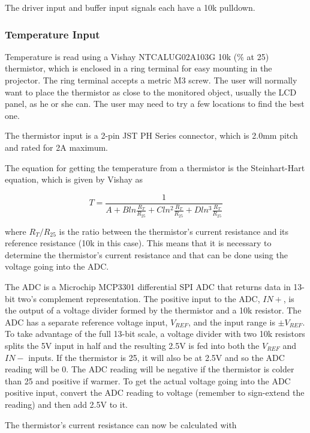 \documentclass{article}
\begin{document}
The driver input and buffer input signals each have a 10k\textOmega{} pulldown.

\subsubsection{Temperature Input} \label{sssec:TempInput}
Temperature is read using a Vishay NTCALUG02A103G 10k (\% at 25\textcelsius) thermistor,
which is enclosed in a ring terminal for easy mounting in the projector.  The ring terminal accepts
a metric M3 screw.  The user will normally want to place the thermistor as close to the monitored
object, usually the LCD panel, as he or she can.  The user may need to try a few locations to find
the best one.

The thermistor input is a 2-pin JST PH Series connector, which is 2.0mm pitch and rated for 2A maximum.

The equation for getting the temperature from a thermistor is the Steinhart-Hart equation, which is
given by Vishay as

\[
T = \frac{1}{A + Bln\frac{R_T}{R_{25}} + Cln^2\frac{R_T}{R_{25}} + Dln^3\frac{R_T}{R_{25}}}
\]

where $R_T/R_{25}$ is the ratio between the thermistor's current resistance and its reference
resistance (10k\textOmega{} in this case).  This means that it is necessary to determine the
thermistor's current resistance and that can be done using the voltage going into the ADC.

The ADC is a Microchip MCP3301 differential SPI ADC that returns data in 13-bit two's complement
representation.  The positive input to the ADC, $IN+$, is the output of a voltage divider formed by
the thermistor and a 10k\textOmega{} resistor.  The ADC has a separate reference voltage input,
$V_{REF}$, and the input range is $\pm V_{REF}$.  To take advantage of the full 13-bit scale, a
voltage divider with two 10k\textOmega{} resistors splits the 5V input in half and the resulting
2.5V is fed into both the $V_{REF}$ and $IN-$ inputs.  If the thermistor is 25\textcelsius{}, it
will also be at 2.5V and so the ADC reading will be 0.  The ADC reading will be negative if the
thermistor is colder than 25\textcelsius{} and positive if warmer.  To get the actual voltage going
into the ADC positive input, convert the ADC reading to voltage (remember to sign-extend the
reading) and then add 2.5V to it.

The thermistor's current resistance can now be calculated with
\end{document}
